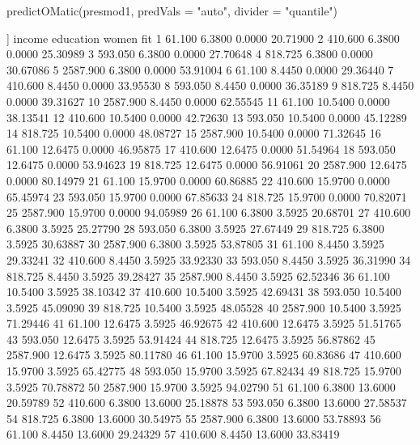 \begin{Schunk}
\begin{Sinput}
 predictOMatic(presmod1, predVals = "auto", divider = "quantile")
\end{Sinput}
\begin{Soutput}
[[1]]
      income education   women      fit
1     61.100    6.3800  0.0000 20.71900
2    410.600    6.3800  0.0000 25.30989
3    593.050    6.3800  0.0000 27.70648
4    818.725    6.3800  0.0000 30.67086
5   2587.900    6.3800  0.0000 53.91004
6     61.100    8.4450  0.0000 29.36440
7    410.600    8.4450  0.0000 33.95530
8    593.050    8.4450  0.0000 36.35189
9    818.725    8.4450  0.0000 39.31627
10  2587.900    8.4450  0.0000 62.55545
11    61.100   10.5400  0.0000 38.13541
12   410.600   10.5400  0.0000 42.72630
13   593.050   10.5400  0.0000 45.12289
14   818.725   10.5400  0.0000 48.08727
15  2587.900   10.5400  0.0000 71.32645
16    61.100   12.6475  0.0000 46.95875
17   410.600   12.6475  0.0000 51.54964
18   593.050   12.6475  0.0000 53.94623
19   818.725   12.6475  0.0000 56.91061
20  2587.900   12.6475  0.0000 80.14979
21    61.100   15.9700  0.0000 60.86885
22   410.600   15.9700  0.0000 65.45974
23   593.050   15.9700  0.0000 67.85633
24   818.725   15.9700  0.0000 70.82071
25  2587.900   15.9700  0.0000 94.05989
26    61.100    6.3800  3.5925 20.68701
27   410.600    6.3800  3.5925 25.27790
28   593.050    6.3800  3.5925 27.67449
29   818.725    6.3800  3.5925 30.63887
30  2587.900    6.3800  3.5925 53.87805
31    61.100    8.4450  3.5925 29.33241
32   410.600    8.4450  3.5925 33.92330
33   593.050    8.4450  3.5925 36.31990
34   818.725    8.4450  3.5925 39.28427
35  2587.900    8.4450  3.5925 62.52346
36    61.100   10.5400  3.5925 38.10342
37   410.600   10.5400  3.5925 42.69431
38   593.050   10.5400  3.5925 45.09090
39   818.725   10.5400  3.5925 48.05528
40  2587.900   10.5400  3.5925 71.29446
41    61.100   12.6475  3.5925 46.92675
42   410.600   12.6475  3.5925 51.51765
43   593.050   12.6475  3.5925 53.91424
44   818.725   12.6475  3.5925 56.87862
45  2587.900   12.6475  3.5925 80.11780
46    61.100   15.9700  3.5925 60.83686
47   410.600   15.9700  3.5925 65.42775
48   593.050   15.9700  3.5925 67.82434
49   818.725   15.9700  3.5925 70.78872
50  2587.900   15.9700  3.5925 94.02790
51    61.100    6.3800 13.6000 20.59789
52   410.600    6.3800 13.6000 25.18878
53   593.050    6.3800 13.6000 27.58537
54   818.725    6.3800 13.6000 30.54975
55  2587.900    6.3800 13.6000 53.78893
56    61.100    8.4450 13.6000 29.24329
57   410.600    8.4450 13.6000 33.83419

\end{Soutput}
\end{Schunk}
